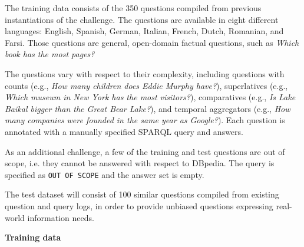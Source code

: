 The training data consists of the 350 questions compiled from previous instantiations of the challenge. The questions are available in eight different languages: English, Spanish, German, Italian, French, Dutch, Romanian, and Farsi.
Those questions are general, open-domain factual questions, such as \emph{Which book has the most pages?}

The questions vary with respect to their complexity, including questions with counts (e.g., \emph{How many children does Eddie Murphy have?}), superlatives (e.g., \emph{Which museum in New York has the most visitors?}), comparatives (e.g., \emph{Is Lake Baikal bigger than the Great Bear Lake?}), and temporal aggregators  (e.g., \emph{How many companies were founded in the same year as Google?}). %
Each question is annotated with a manually specified SPARQL query and answers.

As an additional challenge, a few of the training and test questions are out of scope, i.e. they cannot be answered with respect to DBpedia.
The query is specified as {\tt OUT OF SCOPE} and the answer set is empty.

The test dataset will consist of 100 similar questions compiled from existing question and query logs, in order to provide unbiased questions expressing real-world information needs.

\textbf{Training data}


